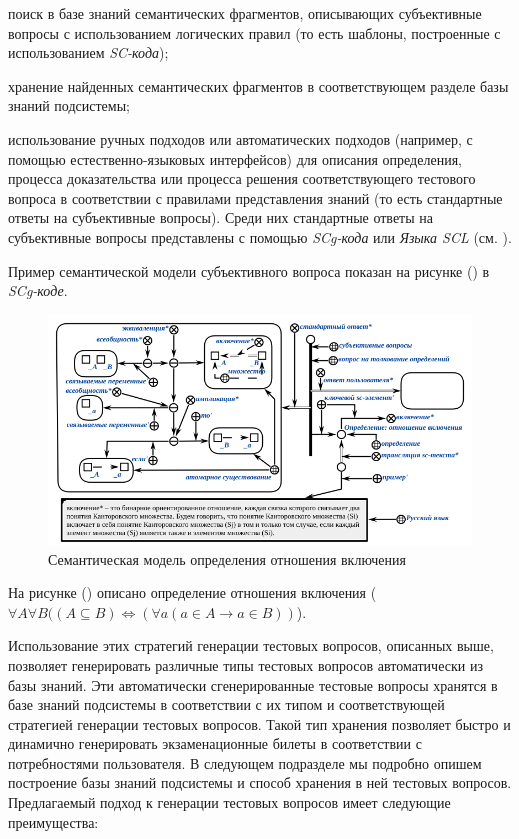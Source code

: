 \begin{textitemize}
	\item поиск в базе знаний семантических фрагментов, описывающих субъективные вопросы с использованием логических правил (то есть шаблоны, построенные с использованием \textit{SC-кода});
	\item хранение найденных семантических фрагментов в соответствующем разделе базы знаний подсистемы;
	\item использование ручных подходов или автоматических подходов (например, с помощью естественно-языковых интерфейсов) для описания определения, процесса доказательства или процесса решения соответствующего тестового вопроса в соответствии с правилами представления знаний (то есть стандартные ответы на субъективные вопросы). Среди них стандартные ответы на субъективные вопросы представлены с помощью \textit{SCg-кода} или \textit{Языка SCL} (см. ).
	
\end{textitemize}

Пример семантической модели субъективного вопроса показан на рисунке (\textit{}) в \textit{SCg-коде}.

\begin{figure}[H]
	\includegraphics[scale=0.8]{author/part7/figures/DI_question_example.png}
	\caption{Семантическая модель определения отношения включения}
	\label{fig:DI_example}
\end{figure}

На рисунке (\textit{}) описано определение отношения включения ($\forall A\forall B((A\subseteq B)\Longleftrightarrow (\forall a(a\in A\rightarrow a\in B))$).

Использование этих стратегий генерации тестовых вопросов, описанных выше, позволяет генерировать различные типы тестовых вопросов автоматически из базы знаний. Эти автоматически сгенерированные тестовые вопросы хранятся в базе знаний подсистемы в соответствии с их типом и соответствующей стратегией генерации тестовых вопросов. Такой тип хранения позволяет быстро и динамично генерировать экзаменационные билеты в соответствии с потребностями пользователя. В следующем подразделе мы подробно опишем построение базы знаний подсистемы и способ хранения в ней тестовых вопросов. Предлагаемый подход к генерации тестовых вопросов имеет следующие преимущества:

